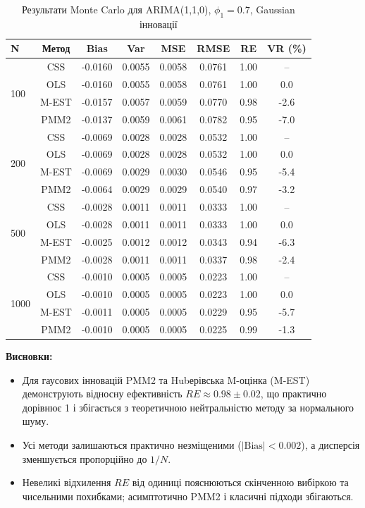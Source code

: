 \documentclass[12pt,a4paper]{article}
\begin{document}
\begin{table}[h]
\centering
\caption{Результати Monte Carlo для ARIMA(1,1,0), $\phi_1 = 0.7$, Gaussian інновації}
\label{tab:arima110_gaussian}
\begin{tabular}{@{}lccccccc@{}}
\toprule
\textbf{N} & \textbf{Метод} & \textbf{Bias} & \textbf{Var} & \textbf{MSE} & \textbf{RMSE} & \textbf{RE} & \textbf{VR (\%)} \\
\midrule
\multirow{4}{*}{100} & CSS  & -0.0160 & 0.0055 & 0.0058 & 0.0761 & 1.00 & -- \\
                     & OLS  & -0.0160 & 0.0055 & 0.0058 & 0.0761 & 1.00 & 0.0 \\
                     & M-EST & -0.0157 & 0.0057 & 0.0059 & 0.0770 & 0.98 & -2.6 \\
                     & PMM2 & -0.0137 & 0.0059 & 0.0061 & 0.0782 & 0.95 & -7.0 \\
\midrule
\multirow{4}{*}{200} & CSS  & -0.0069 & 0.0028 & 0.0028 & 0.0532 & 1.00 & -- \\
                     & OLS  & -0.0069 & 0.0028 & 0.0028 & 0.0532 & 1.00 & 0.0 \\
                     & M-EST & -0.0069 & 0.0029 & 0.0030 & 0.0546 & 0.95 & -5.4 \\
                     & PMM2 & -0.0064 & 0.0029 & 0.0029 & 0.0540 & 0.97 & -3.2 \\
\midrule
\multirow{4}{*}{500} & CSS  & -0.0028 & 0.0011 & 0.0011 & 0.0333 & 1.00 & -- \\
                     & OLS  & -0.0028 & 0.0011 & 0.0011 & 0.0333 & 1.00 & 0.0 \\
                     & M-EST & -0.0025 & 0.0012 & 0.0012 & 0.0343 & 0.94 & -6.3 \\
                     & PMM2 & -0.0028 & 0.0011 & 0.0011 & 0.0337 & 0.98 & -2.4 \\
\midrule
\multirow{4}{*}{1000} & CSS  & -0.0010 & 0.0005 & 0.0005 & 0.0223 & 1.00 & -- \\
                      & OLS  & -0.0010 & 0.0005 & 0.0005 & 0.0223 & 1.00 & 0.0 \\
                      & M-EST & -0.0011 & 0.0005 & 0.0005 & 0.0229 & 0.95 & -5.7 \\
                      & PMM2 & -0.0010 & 0.0005 & 0.0005 & 0.0225 & 0.99 & -1.3 \\
\bottomrule
\end{tabular}
\end{table}

\textbf{Висновки:}
\begin{itemize}
    \item Для гаусових інновацій PMM2 та Hubерівська M-оцінка (M-EST) демонструють відносну ефективність $RE \approx 0.98 \pm 0.02$, що практично дорівнює 1 і збігається з теоретичною нейтральністю методу за нормального шуму.
    \item Усі методи залишаються практично незміщеними ($|\text{Bias}| < 0.002$), а дисперсія зменшується пропорційно до $1/N$.
    \item Невеликі відхилення $RE$ від одиниці пояснюються скінченною вибіркою та чисельними похибками; асимптотично PMM2 і класичні підходи збігаються.
\end{itemize}
\end{document}
